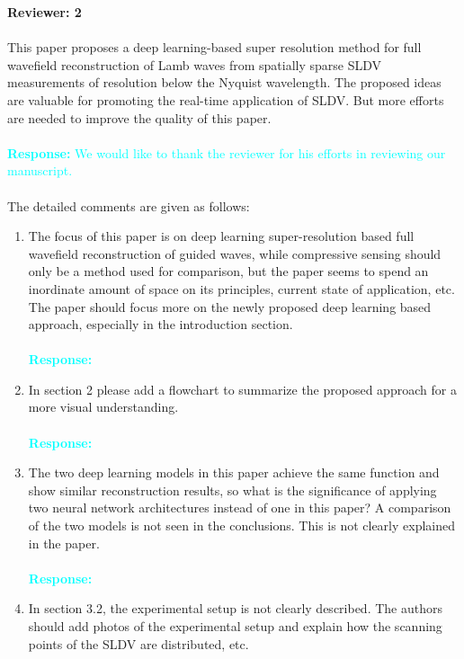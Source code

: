 \documentclass[11pt,a2paper]{report}
\begin{document}
	\noindent\textbf{Reviewer: 2} \\ \\
	This paper proposes a deep learning-based super resolution method for full wavefield reconstruction of Lamb waves from spatially sparse SLDV measurements of resolution below the Nyquist wavelength. 
	The proposed ideas are valuable for promoting the real-time application of SLDV. 
	But more efforts are needed to improve the quality of this paper. \\ \\
	\textcolor{Cyan}
	{
		\textbf{Response:}
		We would like to thank the reviewer for his efforts in reviewing our manuscript.
	} 
	\\ \\
	The detailed comments are given as follows:
	\begin{enumerate}
		\item The focus of this paper is on deep learning super-resolution based full wavefield reconstruction of guided waves, while compressive sensing should only be a method used for comparison, but the paper seems to spend an inordinate amount of space on its principles, current state of application, etc. 
		The paper should focus more on the newly proposed deep learning based approach, especially in the introduction section.
		\\ \\ 
		\textcolor{Cyan}
		{
			\textbf{Response:}\\
		}
		\item  In section 2 please add a flowchart to summarize the proposed approach for a more visual understanding.
		\\ \\ 
		\textcolor{Cyan}
		{
			\textbf{Response:}
		}
		\item The two deep learning models in this paper achieve the same function and show similar reconstruction results, so what is the significance of applying two neural network architectures instead of one in this paper? A comparison of the two models is not seen in the conclusions. 
		This is not clearly explained in the paper. 
		\\ \\ 
		\textcolor{Cyan}
		{
			\textbf{Response:}
		}
		\item In section 3.2, the experimental setup is not clearly described. 
		The authors should add photos of the experimental setup and explain how the scanning points of the SLDV are distributed, etc.
		\\ \\ 

\end{enumerate}
\end{document}
